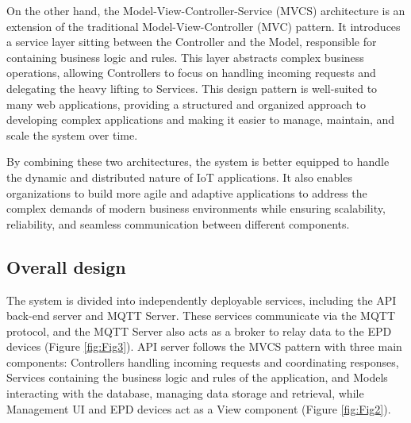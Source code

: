 \documentclass[../Main.tex]{subfiles}
\begin{document}
On the other hand, the Model-View-Controller-Service (MVCS) architecture is an extension of the traditional Model-View-Controller (MVC) pattern. It introduces a service layer sitting between the Controller and the Model, responsible for containing business logic and rules. This layer abstracts complex business operations, allowing Controllers to focus on handling incoming requests and delegating the heavy lifting to Services. This design pattern is well-suited to many web applications, providing a structured and organized approach to developing complex applications and making it easier to manage, maintain, and scale the system over time.

By combining these two architectures, the system is better equipped to handle the dynamic and distributed nature of IoT applications. It also enables organizations to build more agile and adaptive applications to address the complex demands of modern business environments while ensuring scalability, reliability, and seamless communication between different components.

\subsection{Overall design}
The system is divided into independently deployable services, including the API back-end server and MQTT Server. These services communicate via the MQTT protocol, and the MQTT Server also acts as a broker to relay data to the EPD devices (Figure \ref{fig:Fig3}). API server follows the MVCS pattern with three main components: Controllers handling incoming requests and coordinating responses, Services containing the business logic and rules of the application, and Models interacting with the database, managing data storage and retrieval, while Management UI and EPD devices act as a View component (Figure \ref{fig:Fig2}).
\end{document}
